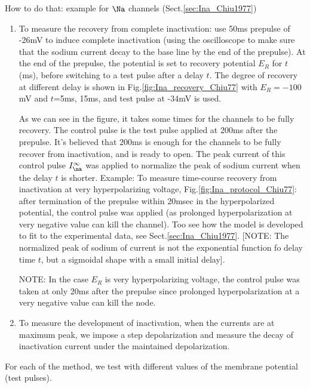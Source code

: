 How to do that: example for $\Na$ channels (Sect.\ref{sec:Ina_Chiu1977})
\begin{enumerate}
  \item To measure the recovery from complete inactivation: use 50ms
  prepulse of -26mV to induce complete inactivation \citep{chiu1977} (using
  the oscilloscope to make sure that the sodium current decay to the base line
  by the end of the prepulse). At the end of the prepulse, the potential is set
  to recovery potential $E_R$ for $t$(ms), before switching to a test
  pulse after a delay $t$. The degree of recovery at different delay is shown in
  Fig.\ref{fig:Ina_recovery_Chiu77} with $E_R=-100$mV and $t$=5ms, 15ms, and
  test pulse at -34mV is used.

  As we can see in the figure, it takes some times for the channels to be fully
  recovery. The control pulse is the test pulse applied at 200ms after the
  prepulse. It's believed that 200ms is enough for the channels to be fully
  recover from inactivation, and is ready to open. The peak current of this
  control pulse $I_\na^\infty$ was applied to normalize the peak of
  sodium current when the delay $t$ is shorter. Example:  To measure time-course
  recovery from inactivation at very hyperpolarizing  voltage,
  Fig.\ref{fig:Ina_protocol_Chiu77}: after termination of the prepulse  within
  20msec in the hyperpolarized potential, the control pulse was  applied (as
  prolonged hyperpolarization at very negative value can kill the  channel). Too
  see how the model is developed to fit to the experimental data, see
  Sect.\ref{sec:Ina_Chiu1977}. [NOTE: The normalized peak of sodium of current
  is not the exponential function fo delay time $t$, but a sigmoidal shape with
  a small initial delay].


NOTE: In the case $E_R$ is very hyperpolarizing voltage, the control pulse was
taken at only 20ms after the prepulse since prolonged hyperpolarization at a
very negative value can kill the node.

  \item To measure the development of inactivation, when the currents are at
  maximum peak, we impose a step depolarization and measure the decay of
  inactivation current under the maintained depolarization.

%
\end{enumerate}
For each of the method, we test with different values of the membrane potential
(test pulses).


